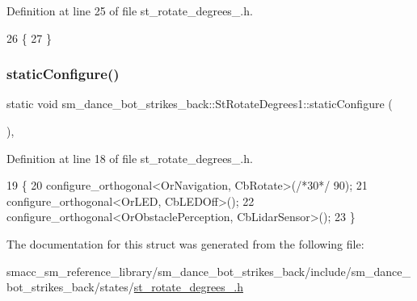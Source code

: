 Definition at line 25 of file st\+\_\+rotate\+\_\+degrees\+\_.\+h.


\begin{DoxyCode}
26   \{
27   \}
\end{DoxyCode}
\mbox{\label{structsm__dance__bot__strikes__back_1_1StRotateDegrees1_a4e1e6d270be9a2d3899176e284ef7860}} 
\subsubsection{\texorpdfstring{static\+Configure()}{staticConfigure()}}
{\footnotesize\ttfamily static void sm\+\_\+dance\+\_\+bot\+\_\+strikes\+\_\+back\+::\+St\+Rotate\+Degrees1\+::static\+Configure (\begin{DoxyParamCaption}{ }\end{DoxyParamCaption})\hspace{0.3cm}{\ttfamily [inline]}, {\ttfamily [static]}}



Definition at line 18 of file st\+\_\+rotate\+\_\+degrees\+\_.\+h.


\begin{DoxyCode}
19   \{
20     configure\_orthogonal<OrNavigation, CbRotate>(\textcolor{comment}{/*30*/} 90);
21     configure\_orthogonal<OrLED, CbLEDOff>();
22     configure\_orthogonal<OrObstaclePerception, CbLidarSensor>();
23   \}
\end{DoxyCode}


The documentation for this struct was generated from the following file\+:\begin{DoxyCompactItemize}
\item 
smacc\+\_\+sm\+\_\+reference\+\_\+library/sm\+\_\+dance\+\_\+bot\+\_\+strikes\+\_\+back/include/sm\+\_\+dance\+\_\+bot\+\_\+strikes\+\_\+back/states/\hyperlink{strikes__back_2include_2sm__dance__bot__strikes__back_2states_2st__rotate__degrees__1_8h}{st\+\_\+rotate\+\_\+degrees\+\_.\+h}\end{DoxyCompactItemize}
